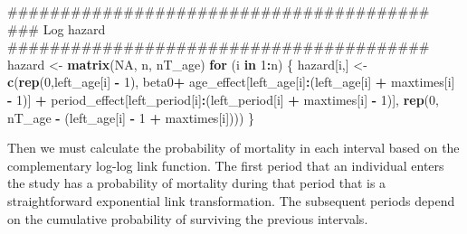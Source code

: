 \documentclass[11pt,]{article}
\newenvironment{Shaded}{\begin{snugshade}}{\end{snugshade}}
\newcommand{\KeywordTok}[1]{\textcolor[rgb]{0.13,0.29,0.53}{\textbf{#1}}}
\newcommand{\DecValTok}[1]{\textcolor[rgb]{0.00,0.00,0.81}{#1}}
\newcommand{\StringTok}[1]{\textcolor[rgb]{0.31,0.60,0.02}{#1}}
\newcommand{\OtherTok}[1]{\textcolor[rgb]{0.56,0.35,0.01}{#1}}
\newcommand{\ControlFlowTok}[1]{\textcolor[rgb]{0.13,0.29,0.53}{\textbf{#1}}}
\newcommand{\OperatorTok}[1]{\textcolor[rgb]{0.81,0.36,0.00}{\textbf{#1}}}
\newcommand{\NormalTok}[1]{#1}
\begin{document}
\begin{Shaded}
\begin{Highlighting}[]
\NormalTok{  ########################################}
\NormalTok{  ### Log hazard}
\NormalTok{  ########################################}
\NormalTok{  hazard <-}\StringTok{ }\KeywordTok{matrix}\NormalTok{(}\OtherTok{NA}\NormalTok{, n, nT_age)}
  \ControlFlowTok{for}\NormalTok{ (i }\ControlFlowTok{in} \DecValTok{1}\OperatorTok{:}\NormalTok{n) \{}
\NormalTok{    hazard[i,] <-}\StringTok{ }\KeywordTok{c}\NormalTok{(}\KeywordTok{rep}\NormalTok{(}\DecValTok{0}\NormalTok{,left_age[i] }\OperatorTok{-}\StringTok{ }\DecValTok{1}\NormalTok{), beta0}\OperatorTok{+}
\StringTok{                      }\NormalTok{age_effect[left_age[i]}\OperatorTok{:}\NormalTok{(left_age[i] }\OperatorTok{+}\StringTok{ }\NormalTok{maxtimes[i] }\OperatorTok{-}\StringTok{ }\DecValTok{1}\NormalTok{)] }\OperatorTok{+}
\StringTok{                      }\NormalTok{period_effect[left_period[i]}\OperatorTok{:}\NormalTok{(left_period[i] }\OperatorTok{+}\StringTok{ }\NormalTok{maxtimes[i] }\OperatorTok{-}\StringTok{ }\DecValTok{1}\NormalTok{)],}
                      \KeywordTok{rep}\NormalTok{(}\DecValTok{0}\NormalTok{, nT_age }\OperatorTok{-}\StringTok{ }\NormalTok{(left_age[i] }\OperatorTok{-}\StringTok{ }\DecValTok{1} \OperatorTok{+}\StringTok{ }\NormalTok{maxtimes[i])))}
\NormalTok{  \}}
\end{Highlighting}
\end{Shaded}

Then we must calculate the probability of mortality in each interval
based on the complementary log-log link function. The first period that
an individual enters the study has a probability of mortality during
that period that is a straightforward exponential link transformation.
The subsequent periods depend on the cumulative probability of surviving
the previous intervals.
\end{document}
